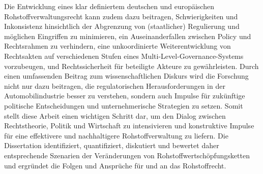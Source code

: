 \documentclass[12pt,a4paper,oneside]{book} %
\begin{document}
Die Entwicklung eines klar definiertem deutschen und europäischen Rohstoffverwaltungsrecht kann zudem dazu beitragen, Schwierigkeiten und Inkonsistenz hinsichtlich der Abgrenzung von (staatlicher) Regulierung und möglichen Eingriffen zu minimieren, ein Auseinanderfallen zwischen Policy und Rechtsrahmen zu verhindern, eine unkoordinierte Weiterentwicklung von Rechtsakten auf verschiedenen Stufen eines Multi-Level-Governance-Systems vorzubeugen, und Rechtssicherheit für beteiligte Akteure zu gewährleisten. Durch einen umfassenden Beitrag zum wissenschaftlichen Diskurs wird die Forschung nicht nur dazu beitragen, die regulatorischen Herausforderungen in der Automobilindustrie besser zu verstehen, sondern auch Impulse für zukünftige politische Entscheidungen und unternehmerische Strategien zu setzen. Somit stellt diese Arbeit einen wichtigen Schritt dar, um den Dialog zwischen Rechtstheorie, Politik und Wirtschaft zu intensivieren und konstruktive Impulse für eine effektivere und nachhaltigere Rohstoffverwaltung zu liefern. Die Dissertation identifiziert, quantifiziert, diskutiert und bewertet daher entsprechende Szenarien der Veränderungen von Rohstoffwertschöpfungsketten und ergründet die Folgen und Ansprüche für und an das Rohstoffrecht.
\end{document}
